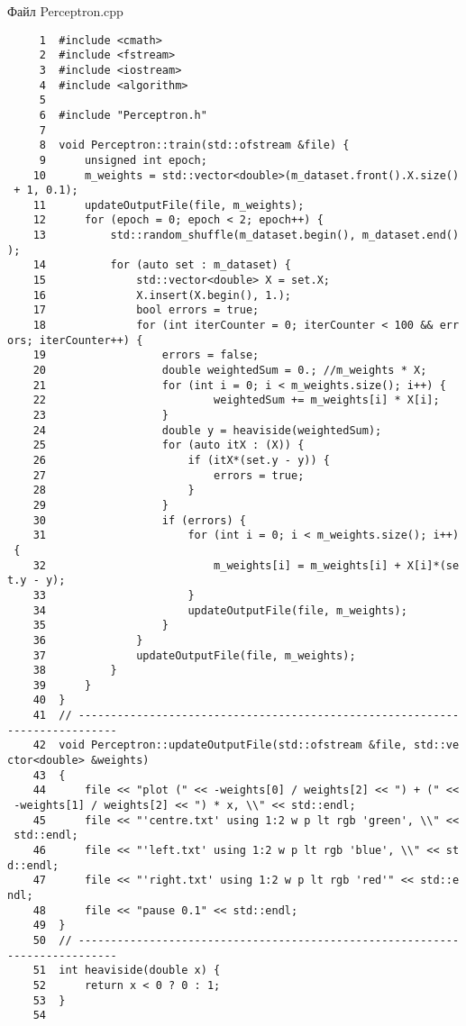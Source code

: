 Файл Perceptron.cpp
\begin{verbatim}
     1  #include <cmath>
     2  #include <fstream>
     3  #include <iostream>
     4  #include <algorithm>
     5
     6  #include "Perceptron.h"
     7
     8  void Perceptron::train(std::ofstream &file) {
     9      unsigned int epoch;
    10      m_weights = std::vector<double>(m_dataset.front().X.size()
 + 1, 0.1);
    11      updateOutputFile(file, m_weights);
    12      for (epoch = 0; epoch < 2; epoch++) {
    13          std::random_shuffle(m_dataset.begin(), m_dataset.end()
);
    14          for (auto set : m_dataset) {
    15              std::vector<double> X = set.X;
    16              X.insert(X.begin(), 1.);
    17              bool errors = true; 
    18              for (int iterCounter = 0; iterCounter < 100 && err
ors; iterCounter++) {  
    19                  errors = false;
    20                  double weightedSum = 0.; //m_weights * X; 
    21                  for (int i = 0; i < m_weights.size(); i++) {
    22                          weightedSum += m_weights[i] * X[i];
    23                  }          
    24                  double y = heaviside(weightedSum);
    25                  for (auto itX : (X)) {
    26                      if (itX*(set.y - y)) {
    27                          errors = true;
    28                      }
    29                  }
    30                  if (errors) {
    31                      for (int i = 0; i < m_weights.size(); i++)
 {
    32                          m_weights[i] = m_weights[i] + X[i]*(se
t.y - y);
    33                      }            
    34                      updateOutputFile(file, m_weights);
    35                  }
    36              }
    37              updateOutputFile(file, m_weights);
    38          }
    39      }
    40  }
    41  // -----------------------------------------------------------
-----------------
    42  void Perceptron::updateOutputFile(std::ofstream &file, std::ve
ctor<double> &weights)
    43  {
    44      file << "plot (" << -weights[0] / weights[2] << ") + (" <<
 -weights[1] / weights[2] << ") * x, \\" << std::endl;
    45      file << "'centre.txt' using 1:2 w p lt rgb 'green', \\" <<
 std::endl;
    46      file << "'left.txt' using 1:2 w p lt rgb 'blue', \\" << st
d::endl;
    47      file << "'right.txt' using 1:2 w p lt rgb 'red'" << std::e
ndl;
    48      file << "pause 0.1" << std::endl;
    49  }
    50  // -----------------------------------------------------------
-----------------
    51  int heaviside(double x) {
    52      return x < 0 ? 0 : 1;
    53  }
    54
\end{verbatim}
